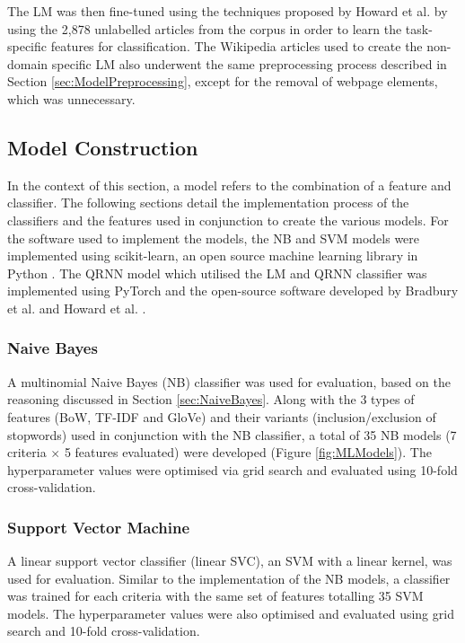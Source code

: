 \documentclass[a4paper,twoside,phd]{BYUPhys}
\begin{document}
The LM was then fine-tuned using the techniques proposed by Howard et al. \cite{Howard2018} by using the 2,878 unlabelled articles from the corpus in order to learn the task-specific features for classification. The Wikipedia articles used to create the non-domain specific LM also underwent the same preprocessing process described in Section \ref{sec:ModelPreprocessing}, except for the removal of webpage elements, which was unnecessary.

\subsection{Model Construction}
\label{sec:ModelSelection}

In the context of this section, a model refers to the combination of a feature and classifier. The following sections detail the implementation process of the classifiers and the features used in conjunction to create the various models.
For the software used to implement the models, the NB and SVM models were implemented using scikit-learn, an open source machine learning library in Python \cite{scikit-learn}. The QRNN model which utilised the LM and QRNN classifier was implemented using PyTorch \cite{paszke2017automatic} and the open-source software developed by Bradbury et al. \cite{bradbury2016quasi} and Howard et al. \cite{Howard2018}. 

\subsubsection{Naive Bayes}
\label{sec:ModelNB}

A multinomial Naive Bayes (NB) classifier was used for evaluation, based on the reasoning discussed in Section \ref{sec:NaiveBayes}. Along with the 3 types of features (BoW, TF-IDF and GloVe) and their variants (inclusion/exclusion of stopwords) used in conjunction with the NB classifier, a total of 35 NB models (7 criteria $\times$ 5 features evaluated) were developed (Figure \ref{fig:MLModels}). The hyperparameter values were optimised via grid search and evaluated using 10-fold cross-validation. 

\subsubsection{Support Vector Machine}
\label{sec:ModelSVM}

A linear support vector classifier (linear SVC), an SVM with a linear kernel, was used for evaluation. Similar to the implementation of the NB models, a classifier was trained for each criteria with the same set of features totalling 35 SVM models. The hyperparameter values were also optimised and evaluated using grid search and 10-fold cross-validation.
\end{document}
